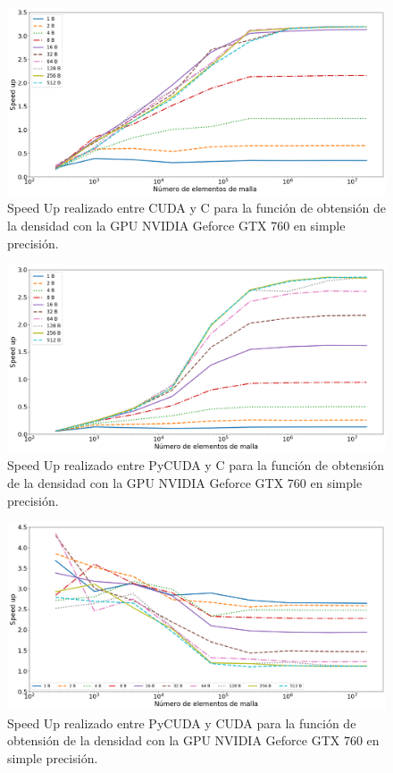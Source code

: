 \begin{figure}[htbp]
	\centering
	\includegraphics[width=\textwidth]{figs/cap4/s_cuda_760_test_simple_10}
	\caption{Speed Up realizado entre CUDA y C para la función de obtensión de la densidad con la GPU NVIDIA Geforce GTX 760 en simple precisión.} 
	\label{fig:s_cuda_760_test_simple_10}	
\end{figure}

\begin{figure}[htbp]
	\centering
	\includegraphics[width=\textwidth]{figs/cap4/s_py_c_760_test_simple_10}
	\caption{Speed Up realizado entre PyCUDA y C para la función de obtensión de la densidad con la GPU NVIDIA Geforce GTX 760 en simple precisión.} 
	\label{fig:s_py_c_760_test_simple_10}	
\end{figure}
\newpage

\begin{figure}[htbp]
	\centering
	\includegraphics[width=\textwidth]{figs/cap4/s_py_760_test_simple_10}
	\caption{Speed Up realizado entre PyCUDA y CUDA para la función de obtensión de la densidad con la GPU NVIDIA Geforce GTX 760 en simple precisión.} 
	\label{fig:s_py_760_test_simple_10}	
\end{figure}



